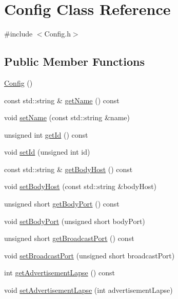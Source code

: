 \hypertarget{class_config}{}\section{Config Class Reference}
\label{class_config}


{\ttfamily \#include $<$Config.\+h$>$}

\subsection*{Public Member Functions}
\begin{DoxyCompactItemize}
\item 
\hyperlink{class_config_abd0c571c116924871e30444b192b792a}{Config} ()
\item 
const std\+::string \& \hyperlink{class_config_a13187ce8db88e4cc61b5137a0da34b12}{get\+Name} () const 
\item 
void \hyperlink{class_config_a04f2e4ad0070a73728c4bce7b7dd0c29}{set\+Name} (const std\+::string \&name)
\item 
unsigned int \hyperlink{class_config_aa43aba31686b3c364b629e42cd492416}{get\+Id} () const 
\item 
void \hyperlink{class_config_af5ab41cca521bb760e228d3cd4ae73ea}{set\+Id} (unsigned int id)
\item 
const std\+::string \& \hyperlink{class_config_a1611555d61b524b6a2562643a59085eb}{get\+Body\+Host} () const 
\item 
void \hyperlink{class_config_a48f1e748dbd6a3257ec891f8338d6d72}{set\+Body\+Host} (const std\+::string \&body\+Host)
\item 
unsigned short \hyperlink{class_config_aea3a5f84be3a9cdf280fff77fdcb51f0}{get\+Body\+Port} () const 
\item 
void \hyperlink{class_config_a04fa867e4f0a01e8771f312a25f6cc75}{set\+Body\+Port} (unsigned short body\+Port)
\item 
unsigned short \hyperlink{class_config_a4362d19cea622b5438a70380aa965b69}{get\+Broadcast\+Port} () const 
\item 
void \hyperlink{class_config_a97e24672b3daed17bee2db3a0c8ee8db}{set\+Broadcast\+Port} (unsigned short broadcast\+Port)
\item 
int \hyperlink{class_config_acbfc17be8e733358890cddded4da52cc}{get\+Advertisement\+Lapse} () const 
\item 
void \hyperlink{class_config_abc2cc4f9cbca79ddcfbe8eb386f2140d}{set\+Advertisement\+Lapse} (int advertisement\+Lapse)
\end{DoxyCompactItemize}


